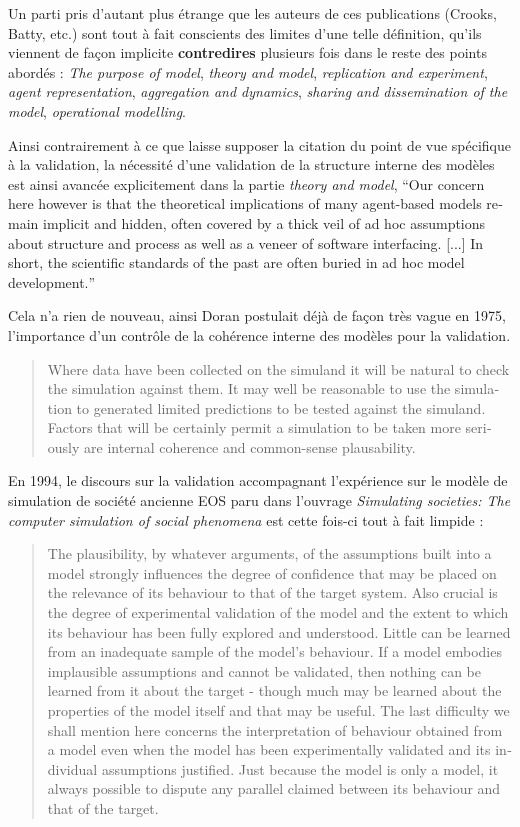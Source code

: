Un parti pris d'autant plus étrange que les auteurs de ces publications (Crooks, Batty, etc.) sont tout à fait conscients des limites d'une telle définition, qu'ils viennent de façon implicite \textbf{contredires} plusieurs fois dans le reste des points abordés : \textit{The purpose of model}, \textit{theory and model}, \textit{replication and experiment}, \textit{agent representation}, \textit{aggregation and dynamics}, \textit{sharing and dissemination of the model}, \textit{operational modelling}.

Ainsi contrairement à ce que laisse supposer la citation du point de vue spécifique à la validation, la nécessité d'une validation de la structure interne des modèles est ainsi avancée explicitement dans la partie \textit{theory and model}, \foreignquote{english}{Our concern here however is that the theoretical implications of many agent-based models remain implicit and hidden, often covered by a thick veil of ad hoc assumptions about structure and process as well as a veneer of software interfacing. [...] In short, the scientific standards of the past are often buried in ad hoc model development.}

Cela n'a rien de nouveau, ainsi Doran postulait déjà de façon très vague en 1975, l'importance d'un contrôle de la cohérence interne des modèles pour la validation.

\foreignblockquote{english}{Where data have been collected on the simuland it will be natural to check the simulation against them. It may well be reasonable to use the simulation to generated limited predictions to be tested against the simuland. Factors that will be certainly permit a simulation to be taken more seriously are internal coherence and common-sense plausability.}

En 1994, le discours sur la validation accompagnant l'expérience sur le modèle de simulation de société ancienne EOS paru dans l'ouvrage \textit{Simulating societies: The computer simulation of social phenomena} est cette fois-ci tout à fait limpide :

\foreignblockquote{english}[{\cite[10-12]{Doran1994}}]{The plausibility, by whatever arguments, of the assumptions built into a model strongly influences the degree of confidence that may be placed on the relevance of its behaviour to that of the target system. Also crucial is the degree of experimental validation of the model and the extent to which its behaviour has been fully explored and understood. Little can be learned from an inadequate sample of the model's behaviour. If a model embodies implausible assumptions and cannot be validated, then nothing can be learned from it about the target - though much may be learned about the properties of the model itself and that may be useful. The last difficulty we shall mention here concerns the interpretation of behaviour obtained from a model even when the model has been experimentally validated and its individual assumptions justified. Just because the model is only a model, it always possible to dispute any parallel claimed between its behaviour and that of the target.}

